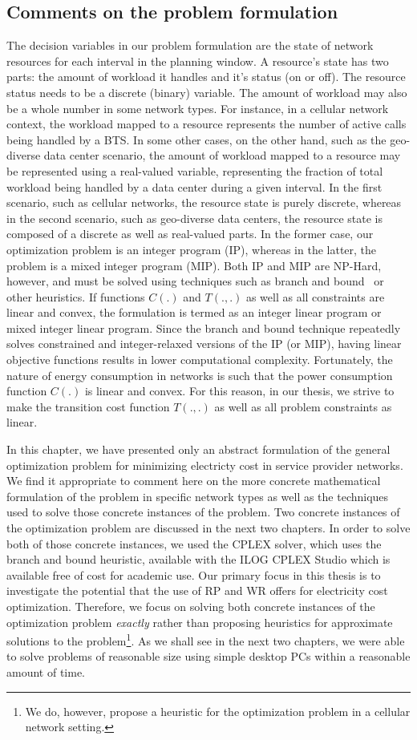 \subsection{Comments on the problem formulation}
The decision variables in our problem formulation are the state of network resources for each interval in the planning window. A resource's state has two parts: the amount of workload it handles and it's status (on or off). The resource status needs to be a discrete (binary) variable. The amount of workload may also be a whole number in some network types. For instance, in a cellular network context, the workload mapped to a resource represents the number of active calls being handled by a BTS. In some other cases, on the other hand, such as the geo-diverse data center scenario, the amount of workload mapped to a resource may be represented using a real-valued variable, representing the fraction of total workload being handled by a data center during a given interval. In the first scenario, such as cellular networks, the resource state is purely discrete, whereas in the second scenario, such as geo-diverse data centers, the resource state is composed of a discrete as well as real-valued parts. In the former case, our optimization problem is an integer program (IP), whereas in the latter, the problem is a mixed integer program (MIP). Both IP and MIP are NP-Hard, however, and must be solved using techniques such as branch and bound~\cite{land60a} or other heuristics. If functions $C(.)$ and $T(.,.)$ as well as all constraints are linear and convex, the formulation is termed as an integer linear program or mixed integer linear program. Since the branch and bound technique repeatedly solves constrained and integer-relaxed versions of the IP (or MIP), having linear objective functions results in lower computational complexity. Fortunately, the nature of energy consumption in networks is such that the power consumption function $C(.)$ is linear and convex. For this reason, in our thesis, we strive to make the transition cost function $T(.,.)$ as well as all problem constraints as linear.

In this chapter, we have presented only an abstract formulation of the general optimization problem for minimizing electricty cost in service provider networks. We find it appropriate to comment here on the more concrete mathematical formulation of the problem in specific network types as well as the techniques used to solve those concrete instances of the problem. Two concrete instances of the optimization problem are discussed in the next two chapters. In order to solve both of those concrete instances, we used the CPLEX solver, which uses the branch and bound heuristic, available with the ILOG CPLEX Studio which is available free of cost for academic use. Our primary focus in this thesis is to investigate the potential that the use of RP and WR offers for electricity cost optimization. Therefore, we focus on solving both concrete instances of the optimization problem \textit{exactly} rather than proposing heuristics for approximate solutions to the problem\footnote{We do, however, propose a heuristic for the optimization problem in a cellular network setting.}. As we shall see in the next two chapters, we were able to solve problems of reasonable size using simple desktop PCs within a reasonable amount of time.